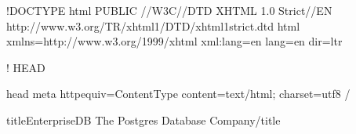 \documentclass[letterpaper,10pt,english,openany,oneside]{sphinxmanual}
\begin{document}
%
\begin{sphinxVerbatim}[commandchars=\\\{\}]
\PYGZlt{}!DOCTYPE html PUBLIC \PYGZdq{}\PYGZhy{}//W3C//DTD XHTML 1.0 Strict//EN\PYGZdq{}
  \PYGZdq{}http://www.w3.org/TR/xhtml1/DTD/xhtml1\PYGZhy{}strict.dtd\PYGZdq{}\PYGZgt{}
\PYGZlt{}html xmlns=\PYGZdq{}http://www.w3.org/1999/xhtml\PYGZdq{} xml:lang=\PYGZdq{}en\PYGZdq{} lang=\PYGZdq{}en\PYGZdq{} dir=\PYGZdq{}ltr\PYGZdq{}\PYGZgt{}

  \PYGZlt{}!\PYGZhy{}\PYGZhy{} \PYGZus{}\PYGZus{}\PYGZus{}\PYGZus{}\PYGZus{}\PYGZus{}\PYGZus{}\PYGZus{}\PYGZus{}\PYGZus{}\PYGZus{}\PYGZus{}\PYGZus{}\PYGZus{}\PYGZus{}\PYGZus{}\PYGZus{}\PYGZus{}\PYGZus{}\PYGZus{}\PYGZus{}\PYGZus{}\PYGZus{}\PYGZus{}\PYGZus{}\PYGZus{}\PYGZus{} HEAD \PYGZus{}\PYGZus{}\PYGZus{}\PYGZus{}\PYGZus{}\PYGZus{}\PYGZus{}\PYGZus{}\PYGZus{}\PYGZus{}\PYGZus{}\PYGZus{}\PYGZus{}\PYGZus{}\PYGZus{}\PYGZus{}\PYGZus{}\PYGZus{}\PYGZus{}\PYGZus{}\PYGZus{}\PYGZus{}\PYGZus{}\PYGZus{}\PYGZus{}\PYGZus{}\PYGZus{} \PYGZhy{}\PYGZhy{}\PYGZgt{}

  \PYGZlt{}head\PYGZgt{}
\PYGZlt{}meta http\PYGZhy{}equiv=\PYGZdq{}Content\PYGZhy{}Type\PYGZdq{} content=\PYGZdq{}text/html; charset=utf\PYGZhy{}8\PYGZdq{} /\PYGZgt{}


    \PYGZlt{}title\PYGZgt{}EnterpriseDB \textbar{} The Postgres Database Company\PYGZlt{}/title\PYGZgt{}


\end{sphinxVerbatim}
\end{document}
